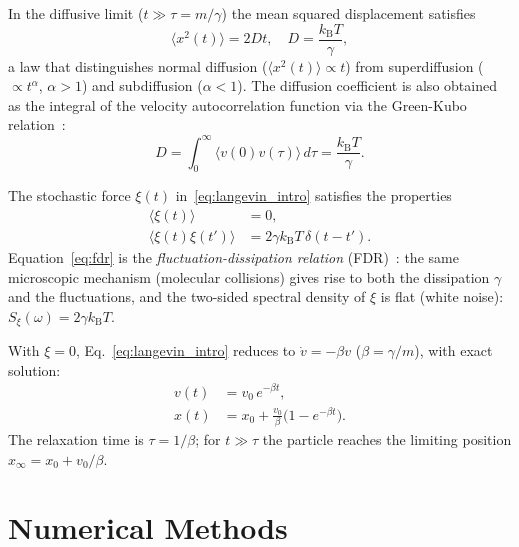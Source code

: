 \documentclass[aps,prl,twocolumn,showpacs,superscriptaddress,longbibliography]{revtex4-2}
\newcommand{\kB}{k_{\mathrm{B}}}
\newcommand{\mean}[1]{\langle #1 \rangle}
\newcommand{\MSD}{\langle x^2(t) \rangle}
\begin{document}
In the diffusive limit ($t\gg\tau{=}m/\gamma$) the mean squared
displacement satisfies~\cite{Einstein1905}
\begin{equation}
	\MSD = 2Dt, \quad D = \frac{\kB T}{\gamma},
	\label{eq:msd}
\end{equation}
a law that distinguishes normal diffusion ($\MSD\propto t$) from
superdiffusion ($\propto t^\alpha$, $\alpha>1$) and subdiffusion
($\alpha<1$).  The diffusion coefficient is also obtained as the
integral of the velocity autocorrelation function via the Green-Kubo
relation~\cite{Uhlenbeck1930}:
\begin{equation}
	D = \int_0^\infty \mean{v(0)v(\tau)}\,d\tau = \frac{\kB T}{\gamma}.
	\label{eq:green_kubo}
\end{equation}

The stochastic force $\xi(t)$ in~\eqref{eq:langevin_intro} satisfies
the properties~\cite{Uhlenbeck1930}
\begin{subequations}
	\label{eq:ruido}
	\begin{align}
		\mean{\xi(t)}       &= 0, \\
		\mean{\xi(t)\xi(t')} &= 2\gamma\kB T\,\delta(t-t').
		\label{eq:fdr}
	\end{align}
\end{subequations}
Equation~\eqref{eq:fdr} is the \textit{fluctuation-dissipation relation}
(FDR)~\cite{Callen1951}: the same microscopic mechanism (molecular
collisions) gives rise to both the dissipation $\gamma$ and the
fluctuations, and the two-sided spectral density of $\xi$ is flat
(white noise): $S_\xi(\omega)=2\gamma\kB T$.

With $\xi=0$, Eq.~\eqref{eq:langevin_intro} reduces to
$\dot{v}=-\beta v$ ($\beta=\gamma/m$), with exact solution:
\begin{subequations}
	\label{eq:sol_exacta}
	\begin{align}
		v(t) &= v_0\,e^{-\beta t}, \label{eq:sol_v}\\
		x(t) &= x_0 + \frac{v_0}{\beta}\bigl(1-e^{-\beta t}\bigr).
		\label{eq:sol_x}
	\end{align}
\end{subequations}
The relaxation time is $\tau=1/\beta$; for $t\gg\tau$ the particle
reaches the limiting position $x_\infty=x_0+v_0/\beta$.

\section{Numerical Methods}
\label{sec:metodos}
\end{document}
